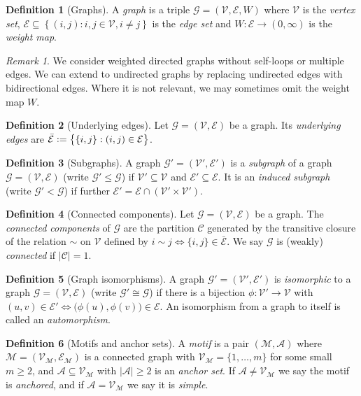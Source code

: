\documentclass[12pt,draft]{ociamthesis}
\theoremstyle{plain}
\theoremstyle{definition}
\newtheorem{definition}{Definition}[chapter]
\theoremstyle{remark}
\newtheorem*{remark}{Remark}
\newcommand\ca[1]{\mathcal{#1}}
\begin{document}
\begin{definition}[Graphs]
A \emph{graph} is a triple $\ca{G} = (\ca{V,E},W)$ where $\ca{V}$ is the
\emph{vertex set}, $\ca{E} \subseteq \left\{ (i,j) : i,j \in \ca{V}, i \neq j
\right\}$ is the \emph{edge set} and $W\colon \ca{E} \to (0,\infty)$ is the
\emph{weight map}.
\end{definition}

\begin{remark}
We consider weighted directed graphs without self-loops or multiple edges. We
can extend to undirected graphs by replacing undirected edges with
bidirectional edges. Where it is not relevant, we may sometimes omit the
weight map $W$.
\end{remark}

\begin{definition}[Underlying edges]
Let $\ca{G} = (\ca{V,E})$ be a graph. Its \emph{underlying edges} are
$\bar{\ca{E}} \vcentcolon = \big\{ \{i,j\} : (i,j) \in \ca{E} \big\}$.
\end{definition}

\begin{definition}[Subgraphs]
A graph $\ca{G'} = (\ca{V',E'})$ is a \emph{subgraph} of a graph $\ca{G} =
(\ca{V,E})$ (write $\ca{G'} \leq \ca{G}$) if $\ca{V'} \subseteq \ca{V}$ and
$\ca{E'} \subseteq \ca{E}$. It is an \emph{induced subgraph} (write $\ca{G'}
< \ca{G}$) if further $\ca{E'} = \ca{E} \cap ( \ca{V'} \times \ca{V'} )$.
\end{definition}

\begin{definition}[Connected components]
Let $\ca{G} = (\ca{V,E})$ be a graph. The \emph{connected components} of
$\ca{G}$ are the partition $\ca{C}$ generated by the transitive closure of
the relation $\sim$ on $\ca{V}$ defined by $i \sim j \iff \{i,j\} \in
\bar{\ca{E}}$. We say $\ca{G}$ is (weakly) \emph{connected} if $|\ca{C}| =
1$.
\end{definition}

\begin{definition}[Graph isomorphisms]
A graph $\ca{G'} = (\ca{V',E'})$ is \emph{isomorphic} to a graph $\ca{G} =
(\ca{V,E})$ (write $\ca{G'} \cong \ca{G}$) if there is a bijection
$\phi\colon \ca{V'} \rightarrow \ca{V}$ with $(u,v) \in \ca{E'} \iff
\big(\phi(u), \phi(v) \big) \in \ca{E}$.
An isomorphism from a graph to itself is called an \emph{automorphism}.
\end{definition}

\begin{definition}[Motifs and anchor sets]
A \emph{motif} is a pair $(\ca{M,A})$ where $\ca{M} = (\ca{V_M,E_M})$ is a
connected graph with $\ca{V_M} = \{ 1, \ldots, m \}$ for some small $m \geq
2$, and $\ca{A} \subseteq \ca{V_M}$ with $|\ca{A}| \geq 2$ is an \emph{anchor
set}. If $\ca{A} \neq \ca{V_M}$ we say the motif is \emph{anchored}, and if
$\ca{A=V_M}$ we say it is \emph{simple}.
\end{definition}
\end{document}
